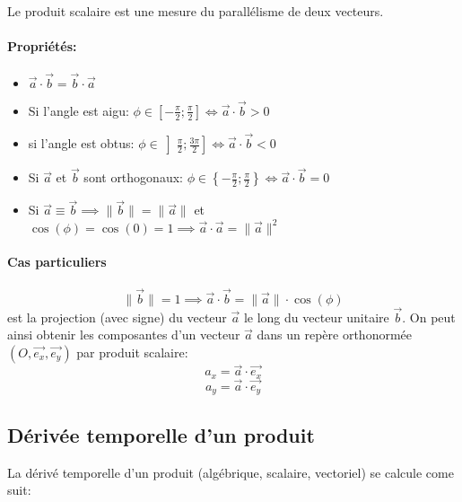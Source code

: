 \documentclass[
    11pt,
    a4paper,
    oneside,
    headinlcude, footinclude,
    twoside,
]{report}
\renewcommand{\vec}[1]{\overrightarrow{#1}}
\begin{document}
Le produit scalaire est une mesure du parallélisme de deux vecteurs.

\paragraph{Propriétés:}

\begin{itemize}
    \item $\vec a \cdot \vec b = \vec b \cdot \vec a$
    \item Si l'angle est aigu: $\phi \in \left[-\frac{\pi}{2};\frac{\pi}{2} \right]
        \iff \vec a \cdot \vec b > 0$
    \item si l'angle est obtus: $\phi \in \left]\frac{\pi}{2};\frac{3\pi}{2} \right]
        \iff \vec a \cdot \vec b < 0$
    \item Si $\vec a$ et $\vec b$ sont orthogonaux: $\phi \in \left\{-\frac{\pi }{2}; \frac{\pi }{2}\right\} \iff
        \vec a \cdot \vec b = 0$
    \item Si $\vec a \equiv \vec b \implies \| \vec b \| = \| \vec a \|$
        et $\cos(\phi) = \cos(0) = 1 \implies \vec a \cdot \vec a = \|\vec{a} \|
        ^{2}$
\end{itemize}

\paragraph{Cas particuliers}
\label{par:cas_particuliers}

$$\| \vec b \| = 1 \implies \vec a \cdot \vec b = \| \vec a\| \cdot \cos(\phi)$$
est la projection (avec signe) du vecteur $\vec a$ le long du vecteur unitaire $\vec b$.
On peut ainsi obtenir les composantes d'un vecteur $\vec a$ dans un repère
orthonormée $(O, \vec{e_{x}}, \vec{e_{y}})$ par produit scalaire: 
$$a_{x} = \vec a \cdot \vec{e_{x}} $$
$$a_{y} = \vec a \cdot \vec{e_{y}} $$

\subsection{Dérivée temporelle d'un produit}

La dérivé temporelle d'un produit (algébrique, scalaire, vectoriel) se calcule
come suit:
\end{document}
